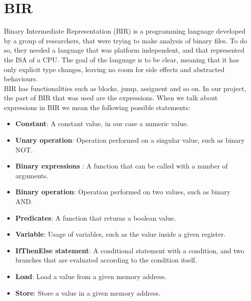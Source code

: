 \section{BIR}
\label{cha:BIR} Binary Intermediate Representation (BIR) is a programming language
developed by a group of researchers, that were trying to make analysis of binary
files. To do so, they needed a language that was platform independent, and that represented
the ISA of a CPU. The goal of the language is to be clear, meaning that it has only
explicit type changes, leaving no room for side effects and abstracted
behaviours. \\

BIR has functionalities such as blocks, jump, assignent and so on. In our project,
the part of BIR that was used are the expressions. When we talk about expressions
in BIR we mean the following possible statements:
\begin{itemize}
  \item \textbf{Constant}: A constant value, in our case a numeric value.

  \item \textbf{Unary operation}: Operation performed on a singular value, such
    as binary NOT.

  \item \textbf{Binary expressions }: A function that can be called with a number
    of arguments.

  \item \textbf{Binary operation}: Operation performed on two values, such as
    binary AND.

  \item \textbf{Predicates}: A function that returns a boolean value.

  \item \textbf{Variable}: Usage of variables, such as the value inside a given
    register.

  \item \textbf{IfThenElse statement}: A conditional statement with a condition,
    and two branches that are evaluated according to the condition itself.

  \item \textbf{Load}: Load a value from a given memory address.

  \item \textbf{Store}: Store a value in a given memory address.
\end{itemize}


